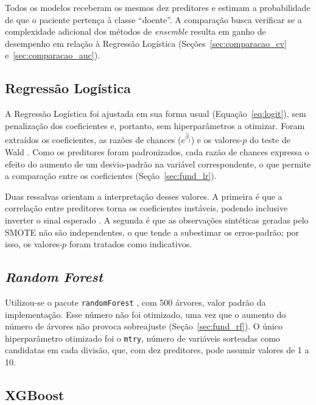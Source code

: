 Todos os modelos receberam os mesmos dez preditores e estimam a probabilidade de que o paciente pertença à classe ``doente''. A comparação busca verificar se a complexidade adicional dos métodos de \textit{ensemble} resulta em ganho de desempenho em relação à Regressão Logística (Seções~\ref{sec:comparacao_cv} e~\ref{sec:comparacao_auc}).

\subsection{Regressão Logística}
\label{sec:regressao_logistica}

A Regressão Logística foi ajustada em sua forma usual (Equação~\ref{eq:logit}), sem penalização dos coeficientes e, portanto, sem hiperparâmetros a otimizar. Foram extraídos os coeficientes, as razões de chances ($e^{\hat{\beta}_j}$) e os valores-$p$ do teste de Wald \cite{Hosmer2005Applied}. Como os preditores foram padronizados, cada razão de chances expressa o efeito do aumento de um desvio-padrão na variável correspondente, o que permite a comparação entre os coeficientes (Seção~\ref{sec:fund_lr}).

Duas ressalvas orientam a interpretação desses valores. A primeira é que a correlação entre preditores torna os coeficientes instáveis, podendo inclusive inverter o sinal esperado \cite{Dormann2013Collinearity}. A segunda é que as observações sintéticas geradas pelo SMOTE não são independentes, o que tende a subestimar os erros-padrão; por isso, os valores-$p$ foram tratados como indicativos.

\subsection{\textit{Random Forest}}
\label{sec:random_forest}

Utilizou-se o pacote \texttt{randomForest} \cite{Liaw2002Classification}, com 500 árvores, valor padrão da implementação. Esse número não foi otimizado, uma vez que o aumento do número de árvores não provoca sobreajuste (Seção~\ref{sec:fund_rf}). O único hiperparâmetro otimizado foi o \texttt{mtry}, número de variáveis sorteadas como candidatas em cada divisão, que, com dez preditores, pode assumir valores de 1 a 10.

\subsection{XGBoost}
\label{sec:xgboost}

